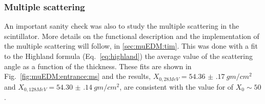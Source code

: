\begin{refsection}
        \subsubsection{Multiple scattering}
            An important sanity check was also to study the multiple scattering in the scintillator. 
            More details on the functional description and the \gf implementation of the multiple scattering will follow, in \ref{sec:muEDM:tim}.
            This was done with a fit to the Highland formula (Eq.~\ref{eq:highland}) the average value of the scattering angle as a function of the thickness. 
            These fits are shown in Fig.~\ref{fig:muEDM:entrance:ms} and the results, $X_{0, 28MeV} = \SI{54.36(17)}{gm/cm^2}$ and $X_{0, 128MeV} = \SI{54.30(14)}{gm/cm^2}$, are consistent with the value for  of $X_{0}\sim 50$.


\end{refsection}
